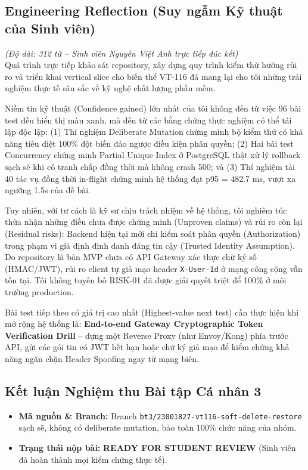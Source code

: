 \documentclass[10pt,a4paper]{article}
\begin{document}
\subsection{Engineering Reflection (Suy ngẫm Kỹ thuật của Sinh viên)}
\begin{tcolorbox}[colback=lightbg,colframe=accent!50,boxrule=0.4pt,arc=1.5pt,left=5pt,right=5pt,top=2.5pt,bottom=2.5pt]
\small
\textit{(Độ dài: 312 từ -- Sinh viên Nguyễn Việt Anh trực tiếp đúc kết)}\\
Quá trình trực tiếp khảo sát repository, xây dựng quy trình kiểm thử hướng rủi ro và triển khai vertical slice cho biến thể VT-116 đã mang lại cho tôi những trải nghiệm thực tế sâu sắc về kỹ nghệ chất lượng phần mềm.

Niềm tin kỹ thuật (Confidence gained) lớn nhất của tôi không đến từ việc 96 bài test đều hiển thị màu xanh, mà đến từ các bằng chứng thực nghiệm có thể tái lập độc lập: (1) Thí nghiệm Deliberate Mutation chứng minh bộ kiểm thử có khả năng tiêu diệt 100\% đột biến đảo ngược điều kiện phân quyền; (2) Hai bài test Concurrency chứng minh Partial Unique Index ở PostgreSQL thật xử lý rollback sạch sẽ khi có tranh chấp đồng thời mà không crash 500; và (3) Thí nghiệm tải 40 tác vụ đồng thời in-flight chứng minh hệ thống đạt p95 = 482.7 ms, vượt xa ngưỡng 1.5s của đề bài.

Tuy nhiên, với tư cách là kỹ sư chịu trách nhiệm về hệ thống, tôi nghiêm túc thừa nhận những điều chưa được chứng minh (Unproven claims) và rủi ro còn lại (Residual risks): Backend hiện tại mới chỉ kiểm soát phân quyền (Authorization) trong phạm vi giả định định danh đáng tin cậy (Trusted Identity Assumption). Do repository là bản MVP chưa có API Gateway xác thực chữ ký số (HMAC/JWT), rủi ro client tự giả mạo header \texttt{X-User-Id} ở mạng công cộng vẫn tồn tại. Tôi không tuyên bố RISK-01 đã được giải quyết triệt để 100\% ở môi trường production.

Bài test tiếp theo có giá trị cao nhất (Highest-value next test) cần thực hiện khi mở rộng hệ thống là: \textbf{End-to-end Gateway Cryptographic Token Verification Drill} -- dựng một Reverse Proxy (như Envoy/Kong) phía trước API, gửi các gói tin có JWT hết hạn hoặc chữ ký giả mạo để kiểm chứng khả năng ngăn chặn Header Spoofing ngay từ mạng biên.
\end{tcolorbox}

\subsection{Kết luận Nghiệm thu Bài tập Cá nhân 3}
\begin{itemize}[leftmargin=1.1em,itemsep=0.2pt]
  \item \textbf{Mã nguồn \& Branch:} Branch \texttt{bt3/23001827-vt116-soft-delete-restore} sạch sẽ, không có deliberate mutation, bảo toàn 100\% chức năng của nhóm.
  \item \textbf{Trạng thái nộp bài:} \textbf{READY FOR STUDENT REVIEW} (Sinh viên đã hoàn thành mọi kiểm chứng thực tế).
\end{itemize}
\end{document}
